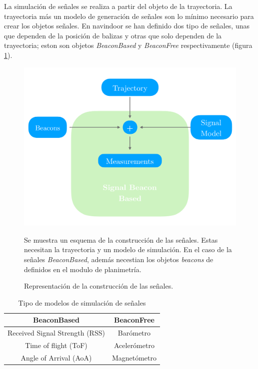 La simulación de señales se realiza a partir del objeto de la trayectoria. La trayectoria más un modelo de generación de señales son lo mínimo necesario para crear los objetos señales. En navindoor se han definido dos tipo de señales, unas que dependen de la posición de balizas y otras que solo dependen de la trayectoria; eston son objetos \emph{BeaconBased} y \emph{BeaconFree} respectivamente (figura \ref{schemaBB}). 

\begin{figure}
    \centering
        \includegraphics[width=0.8\columnwidth]{img/Design/4.pdf}
        \caption{Representación de la construcción de las señales.}
        \footnotesize
        Se muestra un esquema de la construcción de las señales. Estas necesitan la trayectoria y un modelo de simulación. En el caso de la señales \emph{BeaconBased}, además necestian los objetos \emph{beacons} de definidos en el modulo de planimetría.
        \label{schemaBB}
    \end{figure}


\begin{table}[ht]
    \centering
    \begin{tabular}{|c|c|}
        \hline
        {\textbf{BeaconBased}} & {\textbf{BeaconFree}}          \\ \hline
        {Received Signal Strength (RSS)}    & Barómetro        \\ \hline
        {Time of flight (ToF)}              & Acelerómetro               \\ \hline
        {Angle of Arrival (AoA)}            & Magnetómetro             \\ \hline
    \end{tabular}
    \caption{Tipo de modelos de simulación de señales}
    \label{tiposenales}
\end{table}

